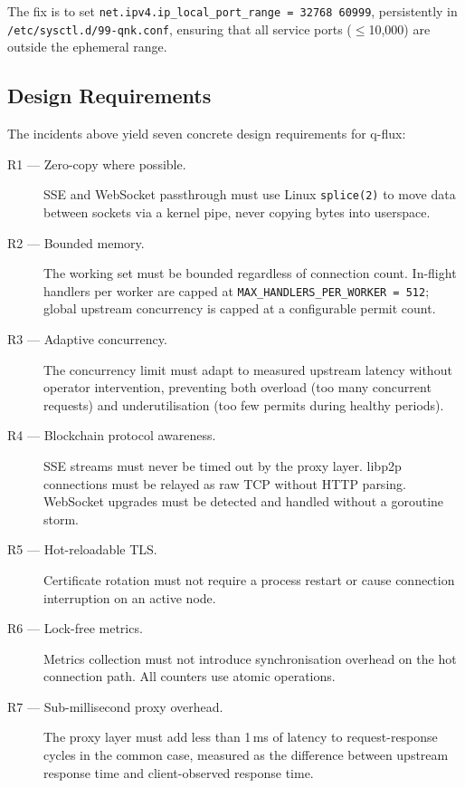 \documentclass[a4paper, 11pt]{article}
\begin{document}
The fix is to set \texttt{net.ipv4.ip\_local\_port\_range = 32768 60999},
persistently in \texttt{/etc/sysctl.d/99-qnk.conf}, ensuring that all service
ports ($\leq$10{,}000) are outside the ephemeral range.

\subsection{Design Requirements}

The incidents above yield seven concrete design requirements for q-flux:

\begin{description}
  \item[R1 --- Zero-copy where possible.]
        SSE and WebSocket passthrough must use Linux \texttt{splice(2)} to move
        data between sockets via a kernel pipe, never copying bytes into userspace.
  \item[R2 --- Bounded memory.]
        The working set must be bounded regardless of connection count.
        In-flight handlers per worker are capped at \texttt{MAX\_HANDLERS\_PER\_WORKER
        = 512}; global upstream concurrency is capped at a configurable permit
        count.
  \item[R3 --- Adaptive concurrency.]
        The concurrency limit must adapt to measured upstream latency without
        operator intervention, preventing both overload (too many concurrent
        requests) and underutilisation (too few permits during healthy periods).
  \item[R4 --- Blockchain protocol awareness.]
        SSE streams must never be timed out by the proxy layer.
        libp2p connections must be relayed as raw TCP without HTTP parsing.
        WebSocket upgrades must be detected and handled without a goroutine storm.
  \item[R5 --- Hot-reloadable TLS.]
        Certificate rotation must not require a process restart or cause
        connection interruption on an active node.
  \item[R6 --- Lock-free metrics.]
        Metrics collection must not introduce synchronisation overhead on the
        hot connection path.  All counters use atomic operations.
  \item[R7 --- Sub-millisecond proxy overhead.]
        The proxy layer must add less than 1\,ms of latency to request-response
        cycles in the common case, measured as the difference between upstream
        response time and client-observed response time.
\end{description}
\end{document}
